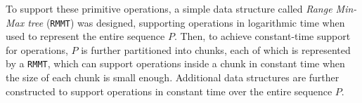 To support these primitive operations, a simple data structure called \emph{Range Min-Max tree} ({\tt RMMT}) was designed, supporting operations in logarithmic time when used to represent the entire sequence $P$. 
Then, to achieve constant-time support for operations, $P$ is further partitioned into chunks, each of which is represented by a {\tt RMMT}, which can support operations inside a chunk in constant time when the size of each chunk is small enough. Additional data structures are further constructed to support operations in constant time over the entire sequence $P$. 


